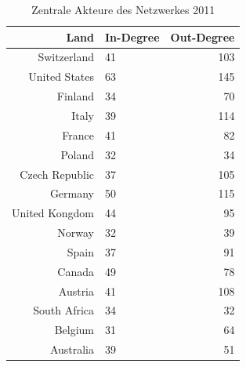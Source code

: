 \documentclass[a4paper,ngerman,oneside,titlepage,bibliography=totoc,11pt]{scrreprt}
\begin{document}
	\begin{table}[h]
\centering
\footnotesize
\begin{tabular}{rlr}
  \hline
 Land 						& In-Degree & Out-Degree\\ 
  \hline
 Switzerland 			& 41				& 103\\ 
 United States 		& 63				& 145\\ 
 Finland 					& 34				& 70\\ 
 Italy 						& 39 				& 114\\ 
 France						& 41				& 82\\ 
 Poland						& 32				& 34\\
 Czech Republic		& 37				& 105\\
 Germany					& 50				& 115\\
 United Kongdom		& 44				& 95\\
 Norway						& 32				& 39\\
 Spain  					& 37				& 91\\
 Canada						& 49				& 78\\
 Austria					& 41				& 108\\
 South Africa			& 34				& 32\\
 Belgium					& 31				& 64\\
 Australia				& 39				& 51\\
   \hline
\end{tabular}
\caption{Zentrale Akteure des Netzwerkes 2011} 
\label{top_2011}
	\end{table}
\end{document}
